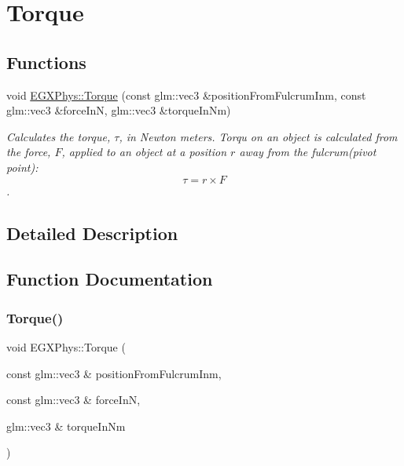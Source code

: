 \hypertarget{group___e_g_x_phys-_kinetics-_torque}{}\section{Torque}
\label{group___e_g_x_phys-_kinetics-_torque}
\subsection*{Functions}
\begin{DoxyCompactItemize}
\item 
void \mbox{\hyperlink{group___e_g_x_phys-_kinetics-_torque_ga12a787853cab88d40412c8290ca41c61}{E\+G\+X\+Phys\+::\+Torque}} (const glm\+::vec3 \&position\+From\+Fulcrum\+Inm, const glm\+::vec3 \&force\+InN, glm\+::vec3 \&torque\+In\+Nm)
\begin{DoxyCompactList}\small\item\em Calculates the torque, $\tau$, in Newton meters. Torqu on an object is calculated from the force, $F$, applied to an object at a position $r$ away from the fulcrum(pivot point)\+: \[\tau=r \times F \]. \end{DoxyCompactList}\end{DoxyCompactItemize}


\subsection{Detailed Description}


\subsection{Function Documentation}
\mbox{\label{group___e_g_x_phys-_kinetics-_torque_ga12a787853cab88d40412c8290ca41c61}} 
\subsubsection{\texorpdfstring{Torque()}{Torque()}}
{\footnotesize\ttfamily void E\+G\+X\+Phys\+::\+Torque (\begin{DoxyParamCaption}\item[{const glm\+::vec3 \&}]{position\+From\+Fulcrum\+Inm,  }\item[{const glm\+::vec3 \&}]{force\+InN,  }\item[{glm\+::vec3 \&}]{torque\+In\+Nm }\end{DoxyParamCaption})}



